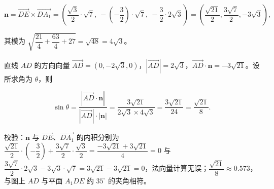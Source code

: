 \begin{answer}
\nopagebreak[4]
\[\boldsymbol n=\overrightarrow{DE}\times\overrightarrow{DA_1}=\left(\frac{\sqrt3}{2}\cdot\sqrt7,\ -\left(-\frac32\right)\cdot\sqrt7,\ -\frac32\cdot2\sqrt3\right)=\left(\frac{\sqrt{21}}{2},\frac{3\sqrt7}{2},-3\sqrt3\right),\]

其模为 $\sqrt{\dfrac{21}{4}+\dfrac{63}{4}+27}=\sqrt{48}=4\sqrt3$。

直线 $AD$ 的方向向量 $\overrightarrow{AD}=(0,-2\sqrt3,0)$，$|\overrightarrow{AD}|=2\sqrt3$，$\overrightarrow{AD}\cdot\boldsymbol n=-3\sqrt{21}$。设所求角为 $\theta$，则

\nopagebreak[4]
\[\sin\theta=\frac{\left|\overrightarrow{AD}\cdot\boldsymbol n\right|}{|\overrightarrow{AD}|\cdot|\boldsymbol n|}=\frac{3\sqrt{21}}{2\sqrt3\times4\sqrt3}=\frac{3\sqrt{21}}{24}=\frac{\sqrt{21}}{8}.\]

校验：$\boldsymbol n$ 与 $\overrightarrow{DE}$、$\overrightarrow{DA_1}$ 的内积分别为 $\dfrac{\sqrt{21}}{2}\cdot\left(-\dfrac32\right)+\dfrac{3\sqrt7}{2}\cdot\dfrac{\sqrt3}{2}=\dfrac{-3\sqrt{21}+3\sqrt{21}}{4}=0$ 与 $\dfrac{3\sqrt7}{2}\cdot2\sqrt3-3\sqrt3\cdot\sqrt7=3\sqrt{21}-3\sqrt{21}=0$，法向量计算无误；$\dfrac{\sqrt{21}}{8}\approx0.573$，与图上 $AD$ 与平面 $A_1DE$ 约 $35^\circ$ 的夹角相符。


\end{answer}
